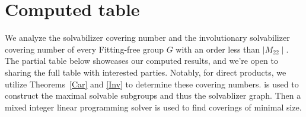 \section{Computed table%
} \label{Appendix}

\newcommand\AGL[2]{\operatorname{AGL}_{#1}\left(#2\right)}
\newcommand\PGL[2]{\operatorname{PGL}_{#1}\left(#2\right)}
\newcommand\PSU[2]{\operatorname{PSU}_{#1}\left(#2^2/#2\right)}
\newcommand\PGU[2]{\operatorname{PGU}_{#1}\left(#2\right)}
\newcommand\PGammaL[2]{\operatorname{P\Gamma{}L}_{#1}\left(#2\right)}
\newcommand\PSigmaL[2]{\operatorname{P\Sigma{}L}_{#1}\left(#2\right)}
\newcommand\PSp[2]{\operatorname{PSp}_{#1}\left(#2\right)}
\newcommand\Alt[1]{\operatorname{A}_{#1}}
\newcommand\Sym[1]{\operatorname{S}_{#1}}
\newcommand\Mathieu[1]{\operatorname{M}_{#1}}
\newcommand\Janko[1]{\operatorname{J}_{#1}}
\newcommand\Sz[1]{\operatorname{Sz}\left(#1\right)}
\newcommand\Aut[1]{\operatorname{Aut}\left(#1\right)}
\newcommand\PrimitiveGroup[4]{\operatorname{Prim}(#1,#2)\cong#3}
\newcommand\PrimitiveGroupShort[4]{\operatorname{Prim}(#1,#2)}
\newcommand\StructureDescription[2]{#1}
\newcommand\WreathProduct[2]{#1 \wr #2}


We analyze the solvabilizer covering number and the involutionary solvabilizer covering number of every Fitting-free group $G$ with an order less than $\mid M_{22}\mid$. The partial table below showcases our computed results, and we're open to sharing the full table with interested parties. Notably, for direct products, we utilize Theorems~\ref{Car} and \ref{Inv} to determine these covering numbers. %
\cite{GAP4} is used to construct the maximal solvable subgroups and
thus the solvablizer graph. Then a mixed integer linear programming solver
is used to find coverings of minimal size. %

